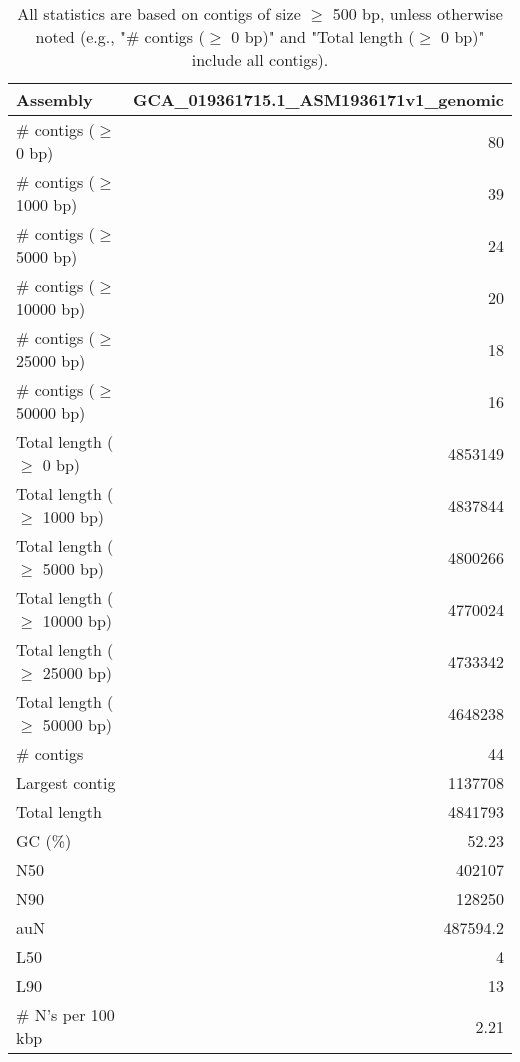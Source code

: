 \documentclass[12pt,a4paper]{article}
\begin{document}
\begin{table}[ht]
\begin{center}
\caption{All statistics are based on contigs of size $\geq$ 500 bp, unless otherwise noted (e.g., "\# contigs ($\geq$ 0 bp)" and "Total length ($\geq$ 0 bp)" include all contigs).}
\begin{tabular}{|l*{1}{|r}|}
\hline
Assembly & GCA\_019361715.1\_ASM1936171v1\_genomic \\ \hline
\# contigs ($\geq$ 0 bp) & 80 \\ \hline
\# contigs ($\geq$ 1000 bp) & 39 \\ \hline
\# contigs ($\geq$ 5000 bp) & 24 \\ \hline
\# contigs ($\geq$ 10000 bp) & 20 \\ \hline
\# contigs ($\geq$ 25000 bp) & 18 \\ \hline
\# contigs ($\geq$ 50000 bp) & 16 \\ \hline
Total length ($\geq$ 0 bp) & 4853149 \\ \hline
Total length ($\geq$ 1000 bp) & 4837844 \\ \hline
Total length ($\geq$ 5000 bp) & 4800266 \\ \hline
Total length ($\geq$ 10000 bp) & 4770024 \\ \hline
Total length ($\geq$ 25000 bp) & 4733342 \\ \hline
Total length ($\geq$ 50000 bp) & 4648238 \\ \hline
\# contigs & 44 \\ \hline
Largest contig & 1137708 \\ \hline
Total length & 4841793 \\ \hline
GC (\%) & 52.23 \\ \hline
N50 & 402107 \\ \hline
N90 & 128250 \\ \hline
auN & 487594.2 \\ \hline
L50 & 4 \\ \hline
L90 & 13 \\ \hline
\# N's per 100 kbp & 2.21 \\ \hline
\end{tabular}
\end{center}
\end{table}
\end{document}
